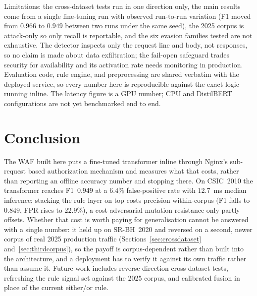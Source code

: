 \documentclass[conference]{IEEEtran}
\begin{document}
Limitations: the cross-dataset tests run in one direction only, the main
results come from a single fine-tuning run with observed run-to-run
variation (F1 moved from $0.966$ to $0.949$ between two runs under the
same seed), the 2025 corpus is attack-only so only recall is reportable,
and the six evasion families tested are not exhaustive. The detector
inspects only the request line and body, not responses, so no claim is
made about data exfiltration; the fail-open safeguard trades security for
availability and its activation rate needs monitoring in production.
Evaluation code, rule engine, and preprocessing are shared verbatim with
the deployed service, so every number here is reproducible against the
exact logic running inline. The latency figure is a GPU number; CPU
and DistilBERT configurations are not yet benchmarked end to end.

\section{Conclusion}
The WAF built here puts a fine-tuned transformer inline through Nginx's
sub-request based authorization mechanism and measures what that costs,
rather than reporting an offline accuracy number and stopping there. On
CSIC~2010 the transformer reaches F1~$0.949$ at a $6.4\%$ false-positive
rate with $12.7$~ms median inference; stacking the rule layer on top
costs precision within-corpus (F1 falls to $0.849$, FPR rises to
$22.9\%$), a cost adversarial-mutation resistance only partly offsets.
Whether that cost is worth paying for generalisation cannot be answered
with a single number: it held up on SR-BH~2020 and reversed on a second,
newer corpus of real 2025 production traffic (Sections~\ref{sec:crossdataset}
and~\ref{sec:thirdcorpus}), so the payoff is corpus-dependent rather than
built into the architecture, and a deployment has to verify it against its
own traffic rather than assume it. Future work includes reverse-direction
cross-dataset tests, refreshing the rule signal set against the 2025
corpus, and calibrated fusion in place of the current either/or rule.

\footnotesize


\end{document}
